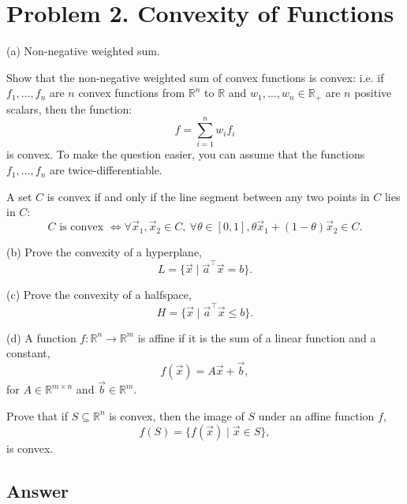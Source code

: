 \documentclass[
  12pt,
]{fphw}
\begin{document}
\newpage
\section*{Problem 2. Convexity of Functions}

(a) Non-negative weighted sum.

Show that the non-negative weighted sum of convex functions is convex: i.e. if $f_1, \dots, f_n$ are $n$ convex
functions from $\mathbb{R}^n$ to $\mathbb{R}$ and $w_1, \dots, w_n \in \mathbb{R}_+$ are $n$ positive scalars, then the function:
\[
f = \sum_{i=1}^n w_i f_i \tag{4}
\]
is convex. To make the question easier, you can assume that the functions $f_1, \dots, f_n$ are twice-differentiable.

A set $C$ is convex if and only if the line segment between any two points in $C$ lies in $C$:
\[
C \text{ is convex } \Longleftrightarrow
\forall \vec{x}_1, \vec{x}_2 \in C, \ \forall \theta \in [0,1],
\theta \vec{x}_1 + (1-\theta)\vec{x}_2 \in C. \tag{5}
\]

(b) Prove the convexity of a hyperplane, 
\[
L = \{\vec{x} \mid \vec{a}^\top \vec{x} = b\}.
\]

(c) Prove the convexity of a halfspace,
\[
H = \{\vec{x} \mid \vec{a}^\top \vec{x} \le b\}.
\]

(d) A function $f : \mathbb{R}^n \to \mathbb{R}^m$ is affine if it is the sum of a linear function and a constant,
\[
f(\vec{x}) = A\vec{x} + \vec{b}, \tag{6}
\]
for $A \in \mathbb{R}^{m\times n}$ and $\vec{b} \in \mathbb{R}^m$.

Prove that if $S \subseteq \mathbb{R}^n$ is convex, then the image of $S$ under an affine function $f$,
\[
f(S) = \{ f(\vec{x}) \mid \vec{x} \in S \}, \tag{7}
\]
is convex.

\subsection*{Answer}
\end{document}
